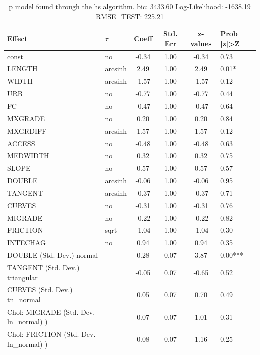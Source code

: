 \begin{table}
	\caption{p model found through the hs algorithm. bic: 3433.60 Log-Likelihood: -1638.19 RMSE_TEST: 225.21}
	\begin{center}
		\begin{tabular}{|l|l|c|c|c|l|}
			\hline
			Effect & $\tau$ & Coeff & Std. Err & z-values & Prob |z|>Z \\
			\hline
			const & no & -0.34 & 1.00 & -0.34 & 0.73 \\
			\hline
			LENGTH & arcsinh & 2.49 & 1.00 & 2.49 & 0.01* \\
			\hline
			WIDTH & arcsinh & -1.57 & 1.00 & -1.57 & 0.12 \\
			\hline
			URB & no & -0.77 & 1.00 & -0.77 & 0.44 \\
			\hline
			FC & no & -0.47 & 1.00 & -0.47 & 0.64 \\
			\hline
			MXGRADE & no & 0.20 & 1.00 & 0.20 & 0.84 \\
			\hline
			MXGRDIFF & arcsinh & 1.57 & 1.00 & 1.57 & 0.12 \\
			\hline
			ACCESS & no & -0.48 & 1.00 & -0.48 & 0.63 \\
			\hline
			MEDWIDTH & no & 0.32 & 1.00 & 0.32 & 0.75 \\
			\hline
			SLOPE & no & 0.57 & 1.00 & 0.57 & 0.57 \\
			\hline
			DOUBLE & arcsinh & -0.06 & 1.00 & -0.06 & 0.95 \\
			\hline
			TANGENT & arcsinh & -0.37 & 1.00 & -0.37 & 0.71 \\
			\hline
			CURVES & no & -0.31 & 1.00 & -0.31 & 0.76 \\
			\hline
			MIGRADE & no & -0.22 & 1.00 & -0.22 & 0.82 \\
			\hline
			FRICTION & sqrt & -1.04 & 1.00 & -1.04 & 0.30 \\
			\hline
			INTECHAG & no & 0.94 & 1.00 & 0.94 & 0.35 \\
			\hline
			DOUBLE (Std. Dev.) normal &  & 0.28 & 0.07 & 3.87 & 0.00*** \\
			\hline
			TANGENT (Std. Dev.) triangular &  & -0.05 & 0.07 & -0.65 & 0.52 \\
			\hline
			CURVES (Std. Dev.) tn_normal &  & 0.05 & 0.07 & 0.70 & 0.49 \\
			\hline
			 Chol: MIGRADE (Std. Dev. ln_normal) ) &  & 0.07 & 0.07 & 1.01 & 0.31 \\
			\hline
			 Chol: FRICTION (Std. Dev. ln_normal) ) &  & 0.08 & 0.07 & 1.16 & 0.25 \\
			\hline

\end{tabular}
\end{center}
\end{table}
